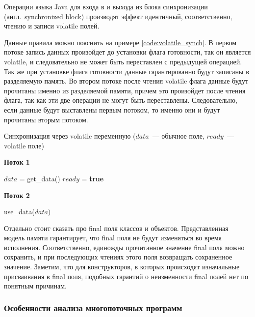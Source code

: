 \documentclass[14pt,titlepage]{extarticle}
\newcommand{\algorithmictitle}[1]{\hspace{8mm}\textbf{#1}}
\newcommand{\BOOLTRUE}{\textbf{true }}
\newcommand{\eng}[1]{{\English#1}}
\newcommand{\engdef}[1]{(англ.~\eng{#1})}
\begin{document}
      Операции языка Java для входа в и выхода из блока синхронизации
      \engdef{synchronized block} производят эффект идентичный, соответственно,
      чтению и записи \eng{volatile} полей.

      Данные правила можно пояснить на примере \ref{code:volatile_synch}.
      В первом потоке запись данных произойдет до установки флага готовности,
      так он является \eng{volatile}, и следовательно не может быть переставлен
      с предыдущей операцией. Так же при установке флага готовности данные
      гарантированно будут записаны в разделяемую память.
      Во втором потоке после чтения \eng{volatile} флага данные будут прочитаны
      именно из разделяемой памяти, причем это произойдет после чтения флага,
      так как эти две операции не могут быть переставлены.
      Следовательно, если данные будут выставлены первым потоком, то именно
      они и будут прочитаны вторым потоком.
      \begin{algorithm}
        \caption{Синхронизация через \eng{volatile} переменную
          ($data$~--- обычное поле, $ready$~--- \eng{volatile} поле)}
        \label{code:volatile_synch}
        \begin{multicols*}{2}
          \algorithmictitle{Поток 1}
          \begin{algorithmic}[1]
            \STATE $data$ = get\_data()
            \STATE $ready$ = \BOOLTRUE
          \end{algorithmic}
          \columnbreak
          \algorithmictitle{Поток 2}
          \begin{algorithmic}[1]
            \STATE {}
            \ENDWHILE
            \STATE use\_data($data$)
          \end{algorithmic}
        \end{multicols*}
      \end{algorithm}

      Отдельно стоит сказать про \eng{final} поля классов и объектов.
      Представленная модель памяти гарантирует, что \eng{final} поля не будут
      изменяться во время исполнения. Соответственно, единожды прочитанное
      значение \eng{final} поля можно сохранить, и при последующих чтениях
      этого поля возвращать сохраненное значение.
      Заметим, что для конструкторов, в которых происходят изначальные
      присваивания в \eng{final} поля, подобных гарантий о неизменности
      \eng{final} полей нет по понятным причинам.

      \subsubsection{Особенности анализа многопоточных программ}
\end{document}
